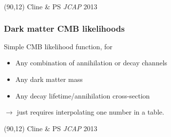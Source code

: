 \documentclass[xcolor=dvipsnames]{beamer}
\begin{document}
\begin{frame}
\begin{textblock}{40}(90,12)
\tiny\color[rgb]{1, 1, 1}Cline \& PS \textit{JCAP} 2013\color[rgb]{0, 0, 0}
\end{textblock}

\end{frame}

\begin{frame}
\frametitle{Dark matter CMB likelihoods}

Simple CMB likelihood function, for
\begin{itemize}
\item Any combination of annihilation or decay channels
\item Any dark matter mass 
\item Any decay lifetime/annihilation cross-section
\end{itemize}
$\rightarrow$ just requires interpolating one number in a table.\vspace{5mm}



\begin{textblock}{40}(90,12)
\tiny\color[rgb]{1, 1, 1}Cline \& PS \textit{JCAP} 2013\color[rgb]{0, 0, 0}
\end{textblock}

\end{frame}
\end{document}
